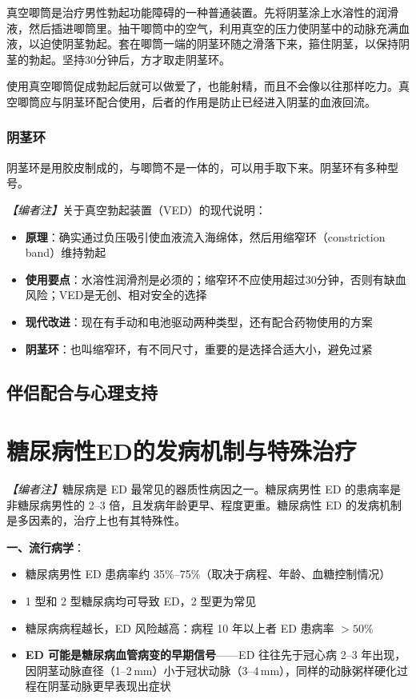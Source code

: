 真空唧筒是治疗男性勃起功能障碍的一种普通装置。先将阴茎涂上水溶性的润滑液，然后插进唧筒里。抽干唧筒中的空气，利用真空的压力使阴茎中的动脉充满血液，以迫使阴茎勃起。套在唧筒一端的阴茎环随之滑落下来，箍住阴茎，以保持阴茎的勃起。坚持30分钟后，方才取走阴茎环。

使用真空唧筒促成勃起后就可以做爱了，也能射精，而且不会像以往那样吃力。真空唧筒应与阴茎环配合使用，后者的作用是防止已经进入阴茎的血液回流。

\subsubsection{阴茎环}

阴茎环是用胶皮制成的，与唧筒不是一体的，可以用手取下来。阴茎环有多种型号。

\noindent\textit{【编者注】}关于真空勃起装置（VED）的现代说明：
\begin{itemize}
	\item \textbf{原理}：确实通过负压吸引使血液流入海绵体，然后用缩窄环（constriction band）维持勃起
	\item \textbf{使用要点}：水溶性润滑剂是必须的；缩窄环不应使用超过30分钟，否则有缺血风险；VED是无创、相对安全的选择
	\item \textbf{现代改进}：现在有手动和电池驱动两种类型，还有配合药物使用的方案
	\item \textbf{阴茎环}：也叫缩窄环，有不同尺寸，重要的是选择合适大小，避免过紧
\end{itemize}
\subsection{伴侣配合与心理支持}

\section{糖尿病性ED的发病机制与特殊治疗}
\label{sec:diabetic_ed}

\noindent\textit{【编者注】}糖尿病是 ED 最常见的器质性病因之一。糖尿病男性 ED 的患病率是非糖尿病男性的 2--3 倍，且发病年龄更早、程度更重。糖尿病性 ED 的发病机制是多因素的，治疗上也有其特殊性。

\vspace{0.5em}
\noindent\textbf{一、流行病学}：

\begin{itemize}[leftmargin=2cm]
	\item 糖尿病男性 ED 患病率约 35\%--75\%（取决于病程、年龄、血糖控制情况）
	\item 1 型和 2 型糖尿病均可导致 ED，2 型更为常见
	\item 糖尿病病程越长，ED 风险越高：病程 10 年以上者 ED 患病率 $>50\%$
	\item \textbf{ED 可能是糖尿病血管病变的早期信号}——ED 往往先于冠心病 2--3 年出现，因阴茎动脉直径（1--2\,mm）小于冠状动脉（3--4\,mm），同样的动脉粥样硬化过程在阴茎动脉更早表现出症状
\end{itemize}

